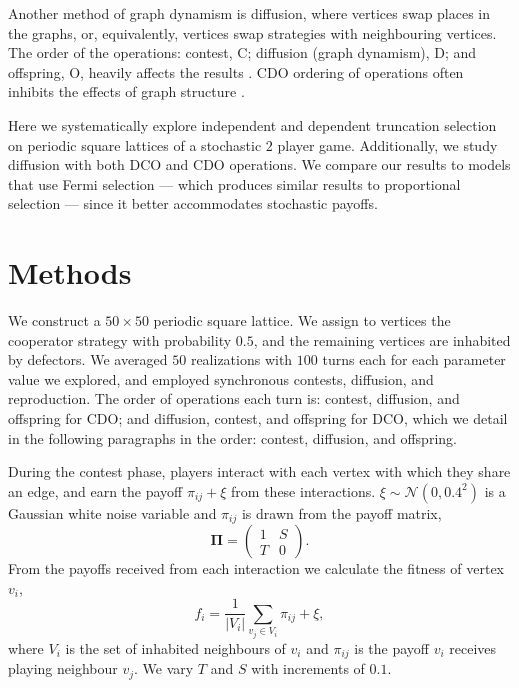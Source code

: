 \documentclass[reprint,aps,pre,twocolumn]{revtex4-1}
\begin{document}
Another method of graph dynamism is diffusion, where vertices swap places in the graphs, or, equivalently, vertices swap strategies with neighbouring vertices. The order of the operations: contest, C; diffusion (graph dynamism), D; and offspring, O, heavily affects the results \cite{sicardi09,vainstein07}. CDO ordering of operations often inhibits the effects of graph structure \cite{sicardi09}.

Here we systematically explore independent and dependent truncation selection on periodic square lattices of a stochastic $2$ player game. Additionally, we study diffusion with both DCO and CDO operations. We compare our results to models that use Fermi selection --- which produces similar results to proportional selection \cite{buesser12} --- since it better accommodates stochastic payoffs.

\section{\label{sec:level2}Methods}

We construct a $50\times50$ periodic square lattice. We assign to vertices the cooperator strategy with probability $0.5$, and the remaining vertices are inhabited by defectors. We averaged $50$ realizations with $100$ turns each for each parameter value we explored, and employed synchronous contests, diffusion, and reproduction. The order of operations each turn is: contest, diffusion, and offspring for CDO; and diffusion, contest, and offspring for DCO, which we detail in the following paragraphs in the order: contest, diffusion, and offspring.

During the contest phase, players interact with each vertex with which they share an edge, and earn the payoff $\pi_{ij} + \xi$ from these interactions. $\xi \sim \mathcal{N}(0,0.4^2)$ %
is a Gaussian white noise variable and $\pi_{ij}$ is drawn from the payoff matrix,
\begin{equation}
 \mathbf{\Pi} = 
\begin{pmatrix}
1 & S \\
T & 0
\end{pmatrix}.
\end{equation}
\noindent From the payoffs received from each interaction we calculate the fitness of vertex $v_i$,
\begin{equation}
f_i = \frac{1}{|V_i|}\sum_{v_j \in V_i} \pi_{ij} + \xi,
\end{equation}
\noindent where $V_i$ is the set of inhabited neighbours of $v_i$ and $\pi_{ij}$ is the payoff $v_i$ receives playing neighbour $v_j$. We vary $T$ and $S$ with increments of $0.1$.
\end{document}
